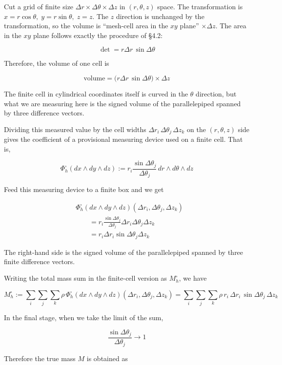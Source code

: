 Cut a grid of finite size
\(\Delta r \times \Delta\theta \times \Delta z\) in \((r,\theta,z)\)
space. The transformation is
\(x = r\cos\theta,\; y = r\sin\theta,\; z = z\). The \(z\) direction is
unchanged by the transformation, so the volume is ``mesh-cell area in
the \(xy\) plane'' \(\times \Delta z\). The area in the \(xy\) plane
follows exactly the procedure of §4.2:

\[\det = r\Delta r\,\sin\Delta\theta\]

Therefore, the volume of one cell is

\[\text{volume} = \bigl(r\Delta r\,\sin\Delta\theta\bigr) \times \Delta z\]

The finite cell in cylindrical coordinates itself is curved in the
\(\theta\) direction, but what we are measuring here is the signed
volume of the parallelepiped spanned by three difference vectors.

Dividing this measured value by the cell widths
\(\Delta r_i\,\Delta\theta_j\,\Delta z_k\) on the \((r,\theta,z)\) side
gives the coefficient of a provisional measuring device used on a finite
cell. That is,

\[
\Phi_h^\square(dx\wedge dy\wedge dz)
:=
r_i\frac{\sin\Delta\theta_j}{\Delta\theta_j}\,dr\wedge d\theta\wedge dz
\]

Feed this measuring device to a finite box and we get

\[
\begin{aligned}
&\Phi_h^\square(dx\wedge dy\wedge dz)
(\Delta r_i,\Delta\theta_j,\Delta z_k)\\
&\qquad =
r_i\frac{\sin\Delta\theta_j}{\Delta\theta_j}
\Delta r_i\Delta\theta_j\Delta z_k \\
&\qquad =
r_i\Delta r_i\sin\Delta\theta_j\Delta z_k
\end{aligned}
\]

The right-hand side is the signed volume of the parallelepiped spanned
by three finite difference vectors.

Writing the total mass sum in the finite-cell version as
\(M_h^\square\), we have

\[
M_h^\square
:=
\sum_i\sum_j\sum_k
\rho\,
\Phi_h^\square(dx\wedge dy\wedge dz)(\Delta r_i,\Delta\theta_j,\Delta z_k)
=
\sum_i\sum_j\sum_k
\rho\,r_i\,\Delta r_i\,\sin\Delta\theta_j\,\Delta z_k
\]

In the final stage, when we take the limit of the sum,

\[
\frac{\sin\Delta\theta_j}{\Delta\theta_j}\to 1
\]

Therefore the true mass \(M\) is obtained as

